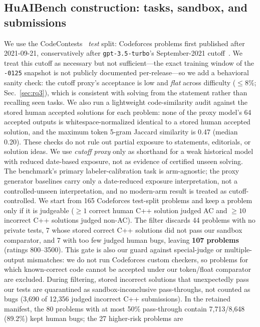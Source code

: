 \documentclass[conference]{IEEEtran}
\begin{document}
\subsection{HuAIBench construction: tasks, sandbox, and submissions}
We use the CodeContests~\cite{li2022alphacode} \emph{test} split: Codeforces
problems first published after 2021-09-21, conservatively after
\texttt{gpt-3.5-turbo}'s September-2021 cutoff~\cite{openai2023gpt4}. We treat this
cutoff as necessary but not sufficient---the exact training window of the
\texttt{-0125} snapshot is not publicly documented per-release---so we add a
behavioral sanity check: the cutoff proxy's acceptance is low and \emph{flat}
across difficulty ($\le\!8\%$; Sec.~\ref{sec:rq3}), which is consistent with solving
from the statement rather than recalling seen tasks. We also run a lightweight
code-similarity audit against the stored human accepted solutions for each problem:
none of the proxy model's 64 accepted outputs is whitespace-normalized identical to a
stored human accepted solution, and the maximum token 5-gram Jaccard similarity is
0.47 (median 0.20). These checks do not rule out partial exposure to statements,
editorials, or solution ideas. We use \emph{cutoff proxy} only as shorthand for a
weak historical model with reduced date-based exposure, not as evidence of certified
unseen solving. The benchmark's primary labeler-calibration task is arm-agnostic;
the proxy generator baselines carry only a date-reduced exposure interpretation, not
a controlled-unseen interpretation, and no modern-arm result is treated as
cutoff-controlled. We start
from 165 Codeforces test-split problems and
keep a problem only if it is judgeable ($\geq\!1$ correct human C++ solution judged
AC and $\geq\!10$ incorrect C++ solutions judged non-AC). The filter
discards 44 problems with no private tests, 7 whose stored correct C++ solutions did
not pass our sandbox comparator, and 7 with too few judged human bugs, leaving
\textbf{107 problems} (ratings 800--3500). This gate is also our guard against
special-judge or multiple-output mismatches: we do not run Codeforces custom
checkers, so problems for which known-correct code cannot be accepted under our
token/float comparator are excluded. During filtering, stored incorrect
solutions that unexpectedly pass our tests are quarantined as sandbox-inconclusive
pass-throughs, not counted as bugs (3{,}690 of 12{,}356 judged incorrect C++
submissions). In the retained manifest, the 80 problems with at most 50\% pass-through
contain 7{,}713/8{,}648 (89.2\%) kept human bugs; the 27 higher-risk problems are
\end{document}
